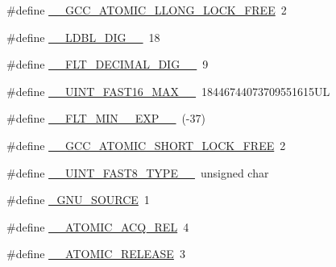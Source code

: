 \begin{DoxyCompactItemize}
\item 
\#define \hyperlink{build-analizer__host-_desktop___qt__5__9__0___g_c_c__64bit-debug_2moc__predefs_8h_afb3458ec122d5fb5304b68bc48184e4e}{\+\_\+\+\_\+\+G\+C\+C\+\_\+\+A\+T\+O\+M\+I\+C\+\_\+\+L\+L\+O\+N\+G\+\_\+\+L\+O\+C\+K\+\_\+\+F\+R\+E\+E}~2
\item 
\#define \hyperlink{build-analizer__host-_desktop___qt__5__9__0___g_c_c__64bit-debug_2moc__predefs_8h_a3aa761811887b1634bfca566fa671424}{\+\_\+\+\_\+\+L\+D\+B\+L\+\_\+\+D\+I\+G\+\_\+\+\_\+}~18
\item 
\#define \hyperlink{build-analizer__host-_desktop___qt__5__9__0___g_c_c__64bit-debug_2moc__predefs_8h_ad666d9aaf02b587abdeffff5ce3545e2}{\+\_\+\+\_\+\+F\+L\+T\+\_\+\+D\+E\+C\+I\+M\+A\+L\+\_\+\+D\+I\+G\+\_\+\+\_\+}~9
\item 
\#define \hyperlink{build-analizer__host-_desktop___qt__5__9__0___g_c_c__64bit-debug_2moc__predefs_8h_a5db559b8fe7a2135f05686e92ce64d9d}{\+\_\+\+\_\+\+U\+I\+N\+T\+\_\+\+F\+A\+S\+T16\+\_\+\+M\+A\+X\+\_\+\+\_\+}~18446744073709551615\+U\+L
\item 
\#define \hyperlink{build-analizer__host-_desktop___qt__5__9__0___g_c_c__64bit-debug_2moc__predefs_8h_a442f6e00169e1726f7b9a05eb3c617d8}{\+\_\+\+\_\+\+F\+L\+T\+\_\+\+M\+I\+N\+\_\+\_\+\+E\+X\+P\+\_\+\+\_\+}~(-\/37)
\item 
\#define \hyperlink{build-analizer__host-_desktop___qt__5__9__0___g_c_c__64bit-debug_2moc__predefs_8h_a889943b266851fe7e9cdac86795507aa}{\+\_\+\+\_\+\+G\+C\+C\+\_\+\+A\+T\+O\+M\+I\+C\+\_\+\+S\+H\+O\+R\+T\+\_\+\+L\+O\+C\+K\+\_\+\+F\+R\+E\+E}~2
\item 
\#define \hyperlink{build-analizer__host-_desktop___qt__5__9__0___g_c_c__64bit-debug_2moc__predefs_8h_a8cf0f2397b96d2a198ff932dbfa50344}{\+\_\+\+\_\+\+U\+I\+N\+T\+\_\+\+F\+A\+S\+T8\+\_\+\+T\+Y\+P\+E\+\_\+\+\_\+}~unsigned char
\item 
\#define \hyperlink{build-analizer__host-_desktop___qt__5__9__0___g_c_c__64bit-debug_2moc__predefs_8h_a369266c24eacffb87046522897a570d5}{\+\_\+\+G\+N\+U\+\_\+\+S\+O\+U\+R\+C\+E}~1
\item 
\#define \hyperlink{build-analizer__host-_desktop___qt__5__9__0___g_c_c__64bit-debug_2moc__predefs_8h_acdfdd67de0664b690c42bba327cf7da1}{\+\_\+\+\_\+\+A\+T\+O\+M\+I\+C\+\_\+\+A\+C\+Q\+\_\+\+R\+E\+L}~4
\item 
\#define \hyperlink{build-analizer__host-_desktop___qt__5__9__0___g_c_c__64bit-debug_2moc__predefs_8h_a5822cf04414d99e0ee81e8bbe182226b}{\+\_\+\+\_\+\+A\+T\+O\+M\+I\+C\+\_\+\+R\+E\+L\+E\+A\+S\+E}~3
\end{DoxyCompactItemize}


